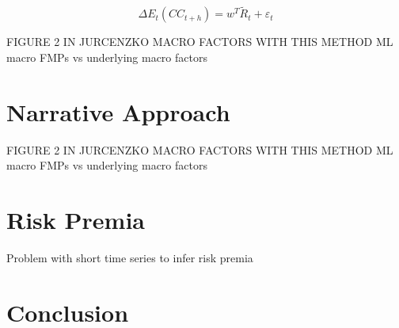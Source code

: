 \begin{equation}
\Delta E_t(CC_{t+h}) = w^T \tilde{R}_{t} + \varepsilon_t
\end{equation}

FIGURE 2 IN JURCENZKO MACRO FACTORS WITH THIS METHOD
ML macro FMPs vs underlying macro factors
\section{Narrative Approach}

FIGURE 2 IN JURCENZKO MACRO FACTORS WITH THIS METHOD
ML macro FMPs vs underlying macro factors

\section{Risk Premia}

Problem with short time series to infer risk premia

\section{Conclusion}

